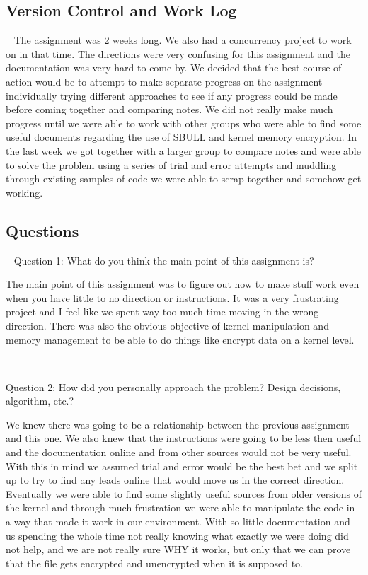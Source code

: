 \documentclass[10pt,journal,onecolumn,compsoc]{IEEEtran}
\begin{document}
\subsection{\textbf{Version Control and Work Log}} ~
The assignment was 2 weeks long. We also had a concurrency project to work on in that time. The directions were very confusing for this assignment and the documentation was very hard to come by. We decided that the best course of action would be to attempt to make separate progress on the assignment individually trying different approaches to see if any progress could be made before coming together and comparing notes. We did not really make much progress until we were able to work with other groups who were able to find some useful documents regarding the use of SBULL and kernel memory encryption. In the last week we got together with a larger group to compare notes and were able to solve the problem using a series of trial and error attempts and muddling through existing samples of code we were able to scrap together and somehow get working. \par

\subsection{\textbf{Questions}}~
\noindent Question 1: What do you think the main point of this assignment is?\par
The main point of this assignment was to figure out how to make stuff work even when you have little to no direction or instructions. It was a very frustrating project and I feel like we spent way too much time moving in the wrong direction. There was also the obvious objective of kernel manipulation and memory management to be able to do things like encrypt data on a kernel level.\par ~

\noindent Question 2: How did you personally approach the problem? Design decisions, algorithm, etc.?\par
We knew there was going to be a relationship between the previous assignment and this one. We also knew that the instructions were going to be less then useful and the documentation online and from other sources would not be very useful. With this in mind we assumed trial and error would be the best bet and we split up to try to find any leads online that would move us in the correct direction. Eventually we were able to find some slightly useful sources from older versions of the kernel and through much frustration we were able to manipulate the code in a way that made it work in our environment. With so little documentation and us spending the whole time not really knowing what exactly we were doing did not help, and we are not really sure WHY it works, but only that we can prove that the file gets encrypted and unencrypted when it is supposed to. \par~ 
\end{document}

